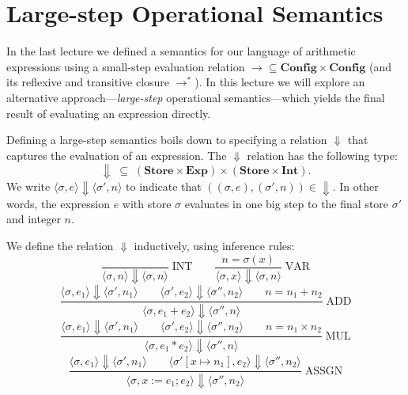 % 
\section{Large-step Operational Semantics}

In the last lecture we defined a semantics for our language of arithmetic expressions using a
small-step evaluation relation $\to \subseteq \mathbf{Config} \times \mathbf{Config}$ (and its
reflexive and transitive closure $\to^*$). In this lecture we will explore an alternative
approach---\emph{large-step} operational semantics---which yields the final result of
evaluating an expression directly.

Defining a large-step semantics boils down to specifying a relation $\Downarrow$ that captures
the evaluation of an expression. The $\Downarrow$ relation has the following type:
\[
\Downarrow \; \subseteq \; (\mathbf{Store} \times \mathbf{Exp}) \times (\mathbf{Store} \times
\mathbf{Int}).
\]
We write $\langle \sigma, e \rangle \Downarrow \langle \sigma', n \rangle$ to indicate that
$((\sigma, e), (\sigma', n)) \in {\Downarrow}$. In other words, the expression $e$ with store
$\sigma$ evaluates in one big step to the final store $\sigma'$ and integer $n$.

We define the relation $\Downarrow$ inductively, using inference rules:
\[
\frac{}{\langle \sigma, n \rangle \Downarrow \langle \sigma, n \rangle} \; \text{INT}
\qquad
\frac{n = \sigma(x)}{\langle \sigma, x \rangle \Downarrow \langle \sigma, n \rangle} \;
\text{VAR}
\]
\[
\frac{\langle \sigma, e_1 \rangle \Downarrow \langle \sigma', n_1 \rangle \qquad \langle
\sigma', e_2 \rangle \Downarrow \langle \sigma'', n_2 \rangle \qquad n = n_1 + n_2}{\langle
\sigma, e_1 + e_2 \rangle \Downarrow \langle \sigma'', n \rangle} \; \text{ADD}
\]
\[
\frac{\langle \sigma, e_1 \rangle \Downarrow \langle \sigma', n_1 \rangle \qquad \langle
\sigma', e_2 \rangle \Downarrow \langle \sigma'', n_2 \rangle \qquad n = n_1 \times n_2}{\langle
\sigma, e_1 * e_2 \rangle \Downarrow \langle \sigma'', n \rangle} \; \text{MUL}
\]
\[
\frac{\langle \sigma, e_1 \rangle \Downarrow \langle \sigma', n_1 \rangle \qquad \langle
\sigma'[x \mapsto n_1], e_2 \rangle \Downarrow \langle \sigma'', n_2 \rangle}{\langle \sigma, x
:= e_1 ; e_2 \rangle \Downarrow \langle \sigma'', n_2 \rangle} \; \text{ASSGN}
\]

